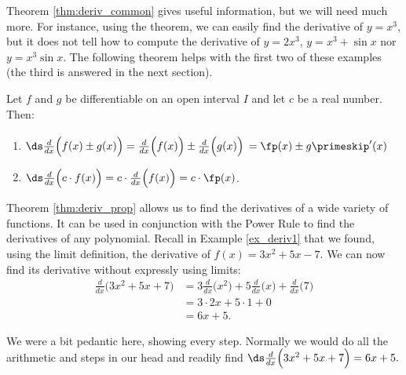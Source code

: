 Theorem \ref{thm:deriv_common} gives useful information, but we will need much more. For instance, using the theorem, we can easily find the derivative of $y=x^3$, but it does not tell how to compute the derivative of $y=2x^3$, $y=x^3+\sin x$ nor $y=x^3\sin x$. The following theorem helps with the first two of these examples (the third is answered in the next section).
\enlargethispage{\baselineskip}

{Let $f$ and $g$ be differentiable on an open interval $I$ and let $c$ be a real number. Then:
	\begin{enumerate}
	\item	{}
	
	$\ds \frac{d}{dx}\Big(f(x) \pm g(x)\Big) = \frac{d}{dx}\Big(f(x)\Big) \pm \frac{d}{dx}\Big(g(x)\Big)$ $= \rule{0pt}{15pt}\fp(x)\pm g\primeskip'(x)$
	\item		{}
	
	$\ds \frac{d}{dx}\Big(c\cdot f(x)\Big) = c\cdot\frac{d}{dx}\Big(f(x)\Big) = c\cdot\fp(x)$.
	\end{enumerate}
}

Theorem \ref{thm:deriv_prop} allows us to find the derivatives of a wide variety of functions. It can be used in conjunction with the Power Rule to find the derivatives of any polynomial. Recall in Example \ref{ex_deriv1} that we found, using the limit definition, the derivative of $f(x) = 3x^2+5x-7$. We can now find its derivative without expressly using limits:
		\begin{align*}
		\frac{d}{dx}\Big(3x^2+5x+7\Big) &= 3\frac{d}{dx}\Big(x^2\Big) + 5\frac{d}{dx}\Big(x\Big) + \frac{d}{dx}\Big(7\Big) \\
																		&= 3\cdot 2x+5\cdot 1+ 0\\
																		&= 6x+5.
		\end{align*}

We were a bit pedantic here, showing every step. Normally we would do all the arithmetic and steps in our head and readily find $\ds \frac{d}{dx}\Big(3x^2+5x+7\Big) = 6x+5.$\\

